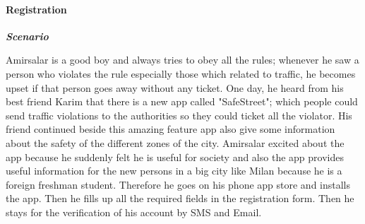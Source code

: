\paragraph{Registration}
\hfill \break

\begin{flushleft}\emph{\textbf{Scenario}}\end{flushleft}

Amirsalar is a good boy and always tries to obey all the rules; whenever he saw a person who violates the rule especially those which related to traffic, he becomes upset if that person goes away without any ticket. One day, he heard from his best friend Karim that there is a new app called "SafeStreet"; which people could send traffic violations to the authorities so they could ticket all the violator. His friend continued beside this amazing feature app also give some information about the safety of the different zones of the city. Amirsalar excited about the app because he suddenly felt he is useful for society and also the app provides useful information for the new persons in a big city like Milan because he is a foreign freshman student. Therefore he goes on his phone app store and installs the app. Then he fills up all the required fields in the registration form. Then he stays for the verification of his account by SMS and Email.



